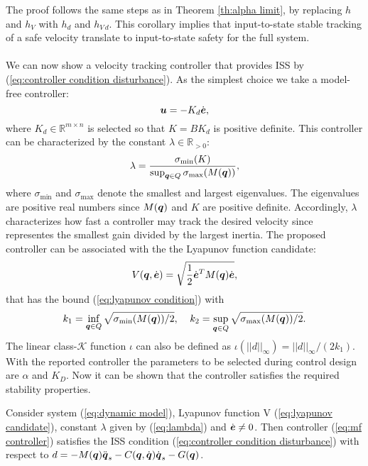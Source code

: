 The proof follows the same steps as in Theorem \ref{th:alpha limit}, by replacing $h$ and $h_V$ with $h_d$ and $h_{V\,d}$. This corollary implies that input-to-state stable tracking of a safe velocity translate to input-to-state safety for the full system.\\
\\
We can now show a velocity tracking controller that provides ISS by (\ref{eq:controller condition disturbance}). As the simplest choice we take a model-free controller:
\begin{equation} \label{eq:mf controller}
    \boldsymbol{u} = -K_d \dot{\boldsymbol{e}},
\end{equation}
where $K_d \in \mathbb{R}^{m \times n}$ is selected so that $K=B K_d$ is positive definite. This controller can be characterized by the constant $\lambda \in \mathbb{R}_{>0}$:
\begin{equation} \label{eq:lambda}
    \lambda = \frac{\sigma_{\min}(K)}{\sup_{{\boldsymbol{q}} \in Q} \sigma_{\max}(M({\boldsymbol{q}}))},
\end{equation}
where $\sigma_{\min}$ and $\sigma_{\max}$ denote the smallest and largest eigenvalues. The eigenvalues are positive real numbers since $M({\boldsymbol{q}})$ and $K$ are positive definite. Accordingly, $\lambda$ characterizes how fast a controller may track the desired velocity since representes the smallest gain divided by the largest inertia. The proposed controller can be associated with the the Lyapunov function candidate:
\begin{equation} \label{eq:lyapunov candidate}
    V({\boldsymbol{q}},\dot{\boldsymbol{e}}) = \sqrt{\frac{1}{2} \dot{\boldsymbol{e}}^T M({\boldsymbol{q}}) \dot{\boldsymbol{e}}},
\end{equation}
that has the bound (\ref{eq:lyapunov condition}) with 
\begin{equation} 
    k_1= \inf_{{\boldsymbol{q}} \in Q} \sqrt{\sigma_{\min} (M({\boldsymbol{q}}))/2}, \;\;\;\; k_2= \sup_{{\boldsymbol{q}} \in Q} \sqrt{\sigma_{\max} (M({\boldsymbol{q}}))/2}.
\end{equation}
The linear class-$\mathcal{K}$ function $\iota$ can also be defined as $\iota(||d||_\infty)=||d||_\infty / (2 k_1)$. With the reported controller the parameters to be selected during control design are $\alpha$ and $K_D$. Now it can be shown that the controller satisfies the required stability properties.
\begin{theorem}
    Consider system (\ref{eq:dynamic model}), Lyapunov function V (\ref{eq:lyapunov candidate}), constant $\lambda$ given by (\ref{eq:lambda}) and $\dot{\boldsymbol{e}} \neq 0$. Then controller (\ref{eq:mf controller}) satisfies the ISS condition (\ref{eq:controller condition disturbance}) with respect to $d = -M({\boldsymbol{q}})\ddot{{\boldsymbol{q}}}_s-C({\boldsymbol{q}},\dot{{\boldsymbol{q}}})\dot{{\boldsymbol{q}}}_s-G({\boldsymbol{q}})$.
\end{theorem}
